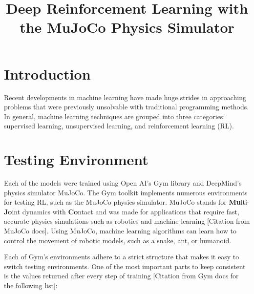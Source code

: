 \documentclass[conference]{IEEEtran}
\begin{document}
\title{Deep Reinforcement Learning with the MuJoCo Physics Simulator}

\author{
    \and
}
\maketitle

\begin{abstract}
    \blindtext
\end{abstract}

\section{Introduction}

Recent developments in machine learning have made huge strides in approaching problems that were previously unsolvable
with traditional programming methods. In general, machine learning techniques are grouped into three categories:
supervised learning, unsupervised learning, and reinforcement learning (RL). \cite{rl_application}

\blindtext
\blinditemize[4]

\blindtext

\section{Testing Environment}

Each of the models were trained using Open AI's Gym library and DeepMind's physics simulator MuJoCo. The Gym toolkit
implements numerous environments for testing RL, such as the MuJoCo physics simulator. MuJoCo stands
for {\bf Mu}lti-{\bf Jo}int dynamics with {\bf Co}ntact and was made for applications that require fast, accurate
physics simulations such as robotics and machine learning [Citation from MuJoCo docs]. Using MuJoCo, machine learning
algorithms can learn how to control the movement of robotic models, such as a snake, ant, or humanoid.

Each of Gym's environments adhere to a strict structure that makes it easy to switch testing environments. One of the
most important parts to keep consistent is the values returned after every step of training [Citation from Gym docs for the following list]:
\end{document}
